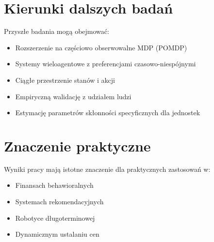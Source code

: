 \section{Kierunki dalszych badań}

Przyszłe badania mogą obejmować:
\begin{itemize}
\item Rozszerzenie na częściowo obserwowalne MDP (POMDP)
\item Systemy wieloagentowe z preferencjami czasowo-niespójnymi
\item Ciągłe przestrzenie stanów i akcji
\item Empiryczną walidację z udziałem ludzi
\item Estymację parametrów skłonności specyficznych dla jednostek
\end{itemize}

\section{Znaczenie praktyczne}

Wyniki pracy mają istotne znaczenie dla praktycznych zastosowań w:
\begin{itemize}
\item Finansach behawioralnych
\item Systemach rekomendacyjnych
\item Robotyce długoterminowej
\item Dynamicznym ustalaniu cen
\end{itemize}